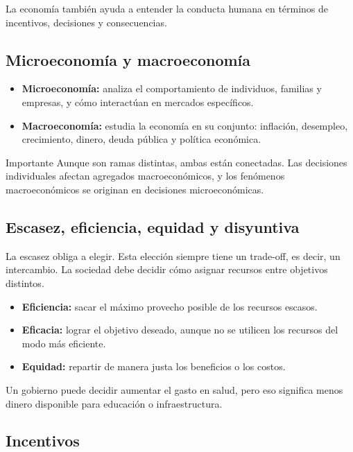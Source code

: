 La economía también ayuda a entender la conducta humana en términos de incentivos, decisiones y consecuencias.

\subsection{Microeconomía y macroeconomía}

\begin{itemize}
    \item \textbf{Microeconomía:} analiza el comportamiento de individuos, familias y empresas, y cómo interactúan en mercados específicos.
    \item \textbf{Macroeconomía:} estudia la economía en su conjunto: inflación, desempleo, crecimiento, dinero, deuda pública y política económica.
\end{itemize}

\begin{observacion}{Importante}
Aunque son ramas distintas, ambas están conectadas. Las decisiones individuales afectan agregados macroeconómicos, y los fenómenos macroeconómicos se originan en decisiones microeconómicas.
\end{observacion}

\subsection{Escasez, eficiencia, equidad y disyuntiva}

La escasez obliga a elegir. Esta elección siempre tiene un trade-off, es decir, un intercambio. La sociedad debe decidir cómo asignar recursos entre objetivos distintos.

\begin{itemize}
    \item \textbf{Eficiencia:} sacar el máximo provecho posible de los recursos escasos.
    \item \textbf{Eficacia:} lograr el objetivo deseado, aunque no se utilicen los recursos del modo más eficiente.
    \item \textbf{Equidad:} repartir de manera justa los beneficios o los costos.
\end{itemize}

\begin{ejemplo}
Un gobierno puede decidir aumentar el gasto en salud, pero eso significa menos dinero disponible para educación o infraestructura.
\end{ejemplo}

\subsection{Incentivos}

